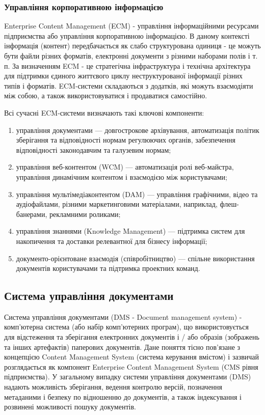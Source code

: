 \subsubsection{Управління корпоративною інформацією}
Enterprise Content Management (ECM) - управління інформаційними ресурсами підприємства або управління корпоративною інформацією.
В даному контексті інформація (контент) передбачається як слабо структурована одиниця - це можуть бути файли різних форматів, електронні документи з різними наборами полів і т. п.
За визначенням ECM - це стратегічна інфраструктура і технічна архітектура для підтримки єдиного життєвого циклу неструктурованої інформації різних типів і форматів. 
ECM-системи складаються з додатків, які можуть взаємодіяти між собою, а також використовуватися і продаватися самостійно. 
\par Всі сучасні ECM-системи визначають такі ключові компоненти:
\begin{enumerate}
\item управління документами --- довгострокове архівування, автоматизація політик зберігання та відповідності нормам регулюючих органів, забезпечення відповідності законодавчим та галузевим нормам;
\item управління веб-контентом (WCM) --- автоматизація ролі веб-майстра, управління динамічним контентом і взаємодією між користувачами;
\item  управління мультімедіаконтентом (DAM) --- управління графічними, відео та аудіофайлами, різними маркетинговими матеріалами, наприклад, флеш-банерами, рекламними роликами;
\item управління знаннями (Knowledge Management) --- підтримка систем для накопичення та доставки релевантної для бізнесу інформації;
\item документо-орієнтоване взаємодія (співробітництво) --- спільне використання документів користувачами та підтримка проектних команд.
\end{enumerate}


\subsection{Система управління документами}
Система управління документами (DMS - Document management system) - комп'ютерна система (або набір комп'ютерних програм), що використовується для відстеження та зберігання електронних документів і / або образів (зображень та інших артефактів) паперових документів.
Дане поняття тісно пов'язане з концепцією Content Management System (система керування вмістом) і зазвичай розглядається як компонент Enterprise Content Management System (CMS рівня підприємства).
У загальному випадку системи управління документами (DMS) надають можливість зберігання, ведення контролю версій, позначення метаданими і безпеку по відношенню до документів, а також індексування і розвинені можливості пошуку документів.
